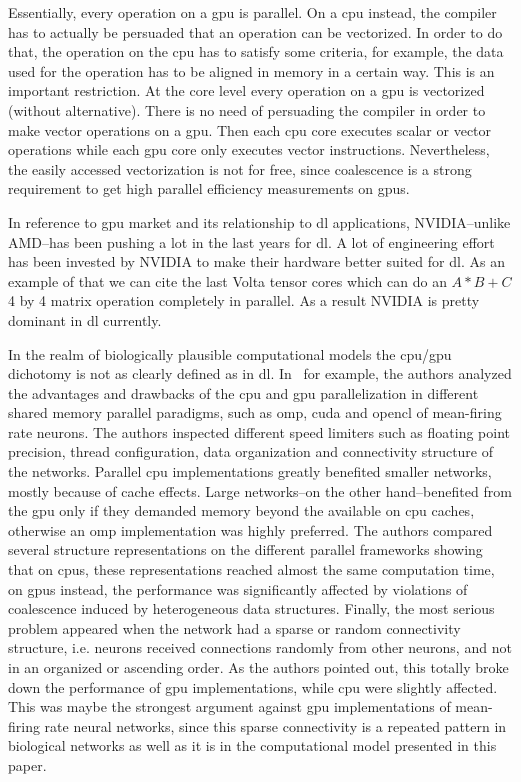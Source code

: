 \documentclass[10pt,journal,compsoc]{IEEEtran}
\begin{document}
Essentially, every operation on a \gls{gpu} is parallel. On a \gls{cpu} instead, the compiler has to actually be persuaded that an operation can be vectorized. In order to do that, the operation on the \gls{cpu} has to satisfy some criteria, for example, the data used for the operation has to be aligned in memory in a certain way. This is an important restriction. At the core level every operation on a \gls{gpu} is vectorized (without alternative). There is no need of persuading the compiler in order to make vector operations on a \gls{gpu}. Then each \gls{cpu} core executes scalar or vector operations while each \gls{gpu} core only executes vector instructions. Nevertheless, the easily accessed vectorization is not for free, since coalescence is a strong requirement to get high parallel efficiency measurements on \glspl{gpu}.

In reference to \gls{gpu} market and its relationship to \gls{dl} applications, NVIDIA--unlike AMD--has been pushing a lot in the last years for \gls{dl}. A lot of engineering effort has been invested by NVIDIA to make their hardware better suited for \gls{dl}. As an example of that we can cite the last Volta tensor cores which can do an $A*B+C$ 4 by 4 matrix operation completely in parallel. As a result NVIDIA is pretty dominant in \gls{dl} currently.

In the realm of biologically plausible computational models the \gls{cpu}/\gls{gpu} dichotomy is not as clearly defined as in \gls{dl}. In~\cite{doi:10.3109/0954898X.2012.739292} for example, the authors analyzed the advantages and drawbacks of the \gls{cpu} and \gls{gpu} parallelization in different shared memory parallel paradigms, such as \gls{omp}, \gls{cuda} and \gls{opencl} of mean-firing rate neurons. The authors inspected different speed limiters such as floating point precision, thread configuration, data organization and connectivity structure of the networks. Parallel \gls{cpu} implementations greatly benefited smaller networks, mostly because of cache effects. Large networks--on the other hand--benefited from the \gls{gpu} only if they demanded memory beyond the available on \gls{cpu} caches, otherwise an \gls{omp} implementation was highly preferred. The authors compared several structure representations on the different parallel frameworks showing that on \glspl{cpu}, these representations reached almost the same computation time, on \glspl{gpu} instead, the performance was significantly affected by violations of coalescence induced by heterogeneous data structures. Finally, the most serious problem appeared when the network had a sparse or random connectivity structure, i.e. neurons received connections randomly from other neurons, and not in an organized or ascending order. As the authors pointed out, this totally broke down the performance of \gls{gpu} implementations, while \gls{cpu} were slightly affected. This was maybe the strongest argument against \gls{gpu} implementations of mean-firing rate neural networks, since this sparse connectivity is a repeated pattern in biological networks as well as it is in the computational model presented in this paper.
\end{document}
